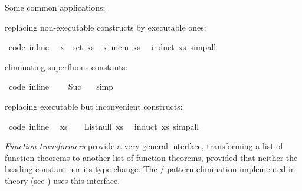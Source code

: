 \begin{isabellebody}
\begin{isamarkuptext}
  Some common applications:%
\end{isamarkuptext}%
\isamarkuptrue%
%
\begin{itemize}
%
\begin{isamarkuptext}%
\item replacing non-executable constructs by executable ones:%
\end{isamarkuptext}%
\isamarkuptrue%
%
\isadelimquoteme
%
\endisadelimquoteme
%
\isatagquoteme
{}\isamarkupfalse%
\ {\isacharbrackleft}code\ inline{\isacharbrackright}{\isacharcolon}\isanewline
\ \ {\isachardoublequoteopen}x\ {\isasymin}\ set\ xs\ {\isasymlongleftrightarrow}\ x\ mem\ xs{\isachardoublequoteclose}\ \isamarkupfalse%
\ {\isacharparenleft}induct\ xs{\isacharparenright}\ simp{\isacharunderscore}all%
\endisatagquoteme
{\isafoldquoteme}%
%
\isadelimquoteme
%
\endisadelimquoteme
%
\begin{isamarkuptext}%
\item eliminating superfluous constants:%
\end{isamarkuptext}%
\isamarkuptrue%
%
\isadelimquoteme
%
\endisadelimquoteme
%
\isatagquoteme
{}\isamarkupfalse%
\ {\isacharbrackleft}code\ inline{\isacharbrackright}{\isacharcolon}\isanewline
\ \ {\isachardoublequoteopen}{}\ {\isacharequal}\ Suc\ {}{\isachardoublequoteclose}\ \isamarkupfalse%
\ simp%
\endisatagquoteme
{\isafoldquoteme}%
%
\isadelimquoteme
%
\endisadelimquoteme
%
\begin{isamarkuptext}%
\item replacing executable but inconvenient constructs:%
\end{isamarkuptext}%
\isamarkuptrue%
%
\isadelimquoteme
%
\endisadelimquoteme
%
\isatagquoteme
{}\isamarkupfalse%
\ {\isacharbrackleft}code\ inline{\isacharbrackright}{\isacharcolon}\isanewline
\ \ {\isachardoublequoteopen}xs\ {\isacharequal}\ {\isacharbrackleft}{\isacharbrackright}\ {\isasymlongleftrightarrow}\ List{\isachardot}null\ xs{\isachardoublequoteclose}\ \isamarkupfalse%
\ {\isacharparenleft}induct\ xs{\isacharparenright}\ simp{\isacharunderscore}all%
\endisatagquoteme
{\isafoldquoteme}%
%
\isadelimquoteme
%
\endisadelimquoteme
%
\end{itemize}
%
\begin{isamarkuptext}%
\noindent \emph{Function transformers} provide a very general interface,
  transforming a list of function theorems to another
  list of function theorems, provided that neither the heading
  constant nor its type change.  The  / 
  pattern elimination implemented in
  theory  (see ) uses this
  interface.


\end{isamarkuptext}
\end{isabellebody}
